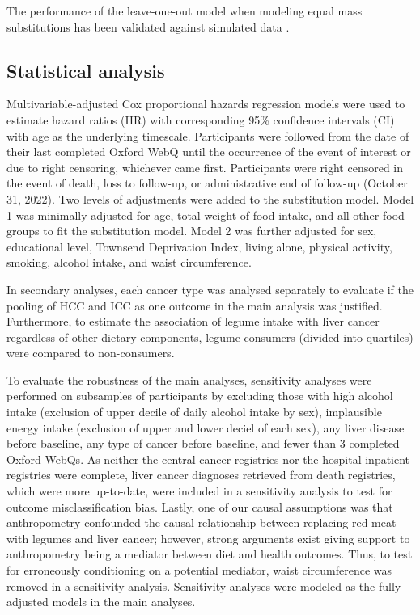 \documentclass[sn-basic,Numbered,iicol,pdflatex]{sn-jnl}
\begin{document}
\noindent The performance of the leave-one-out model when modeling equal
mass substitutions has been validated against simulated data
\citep{Tomova2022}.

\hypertarget{subsec6}{%
\subsection{Statistical analysis}\label{subsec6}}

Multivariable-adjusted Cox proportional hazards regression models were
used to estimate hazard ratios (HR) with corresponding 95\% confidence
intervals (CI) with age as the underlying timescale. Participants were
followed from the date of their last completed Oxford WebQ until the
occurrence of the event of interest or due to right censoring, whichever
came first. Participants were right censored in the event of death, loss
to follow-up, or administrative end of follow-up (October 31, 2022). Two
levels of adjustments were added to the substitution model. Model 1 was
minimally adjusted for age, total weight of food intake, and all other
food groups to fit the substitution model. Model 2 was further adjusted
for sex, educational level, Townsend Deprivation Index, living alone,
physical activity, smoking, alcohol intake, and waist circumference.

In secondary analyses, each cancer type was analysed separately to
evaluate if the pooling of HCC and ICC as one outcome in the main
analysis was justified. Furthermore, to estimate the association of
legume intake with liver cancer regardless of other dietary components,
legume consumers (divided into quartiles) were compared to
non-consumers.

To evaluate the robustness of the main analyses, sensitivity analyses
were performed on subsamples of participants by excluding those with
high alcohol intake (exclusion of upper decile of daily alcohol intake
by sex), implausible energy intake (exclusion of upper and lower deciel
of each sex), any liver disease before baseline, any type of cancer
before baseline, and fewer than 3 completed Oxford WebQs. As neither the
central cancer registries nor the hospital inpatient registries were
complete, liver cancer diagnoses retrieved from death registries, which
were more up-to-date, were included in a sensitivity analysis to test
for outcome misclassification bias. Lastly, one of our causal
assumptions was that anthropometry confounded the causal relationship
between replacing red meat with legumes and liver cancer; however,
strong arguments exist giving support to anthropometry being a mediator
between diet and health outcomes. Thus, to test for erroneously
conditioning on a potential mediator, waist circumference was removed in
a sensitivity analysis. Sensitivity analyses were modeled as the fully
adjusted models in the main analyses.
\end{document}
